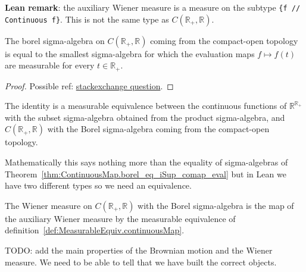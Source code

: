 \textbf{Lean remark}: the auxiliary Wiener measure is a measure on the subtype \texttt{\{f  // Continuous f\}}. This is not the same type as $C(\mathbb{R}_+, \mathbb{R})$.


\begin{theorem}\label{thm:ContinuousMap.borel_eq_iSup_comap_eval}
  \leanok
The borel sigma-algebra on $C(\mathbb{R}_+, \mathbb{R})$ coming from the compact-open topology is equal to the smallest sigma-algebra for which the evaluation maps $f \mapsto f(t)$ are measurable for every $t \in \mathbb{R}_+$.
\end{theorem}

\begin{proof}
Possible ref: \href{https://math.stackexchange.com/questions/4789531/when-does-the-borel-sigma-algebra-of-compact-convergence-coincide-with-the-pr}{stackexchange question}.
\end{proof}


\begin{definition}\label{def:MeasurableEquiv.continuousMap}
  \leanok
The identity is a measurable equivalence between the continuous functions of $\mathbb{R}^{\mathbb{R}_+}$ with the subset sigma-algebra obtained from the product sigma-algebra, and $C(\mathbb{R}_+, \mathbb{R})$ with the Borel sigma-algebra coming from the compact-open topology.

Mathematically this says nothing more than the equality of sigma-algebras of Theorem~\ref{thm:ContinuousMap.borel_eq_iSup_comap_eval} but in Lean we have two different types so we need an equivalence.
\end{definition}


\begin{definition}\label{def:wienerMeasure}
  \leanok
The Wiener measure on $C(\mathbb{R}_+, \mathbb{R})$ with the Borel sigma-algebra is the map of the auxiliary Wiener measure by the measurable equivalence of definition~\ref{def:MeasurableEquiv.continuousMap}.
\end{definition}


TODO: add the main properties of the Brownian motion and the Wiener measure.
We need to be able to tell that we have built the correct objects.
